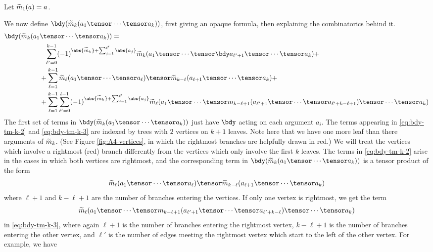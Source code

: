 Let $\widetilde{m}_1(a) = a$.

We now define $\bdy(\tm_k(a_1 \tensor \cdots \tensor a_k))$, first giving an opaque formula, then explaining the combinatorics behind it.
\begin{align}
\notag \bdy(\tm_k(a_1 & \tensor \cdots \tensor a_k)) = \\
\label{eq:bdy-tm-k-1}   & \phantom{+} \sum_{\ell'=0}^{k-1} (-1)^{\abs{\tm_k}+\sum_{j=1}^{\ell'} \abs{a_j}} \tm_k(a_1 \tensor \cdots \tensor \bdy a_{\ell'+1} \tensor \cdots \tensor a_k) + \\
\label{eq:bdy-tm-k-2}   &          +  \sum_{\ell=1}^{k-1} \tm_{\ell}(a_1 \tensor \cdots \tensor a_{\ell}) \tensor \tm_{k-\ell}(a_{\ell+1} \tensor \cdots \tensor a_k) + \\
\label{eq:bdy-tm-k-3}   &          +  \sum_{\ell=1}^{k-1} \sum_{\ell'=0}^{l-1} (-1)^{\abs{\tm_k}+\sum_{j=1}^{\ell'} \abs{a_j}} \tm_{\ell}(a_1 \tensor \cdots \tensor m_{k-\ell + 1}(a_{\ell' + 1} \tensor \cdots \tensor a_{\ell' + k - \ell + 1}) \tensor \cdots \tensor a_k)
\end{align}
The first set of terms in $\bdy(\tm_k(a_1 \tensor \cdots \tensor a_k))$ just have $\bdy$ acting on each argument $a_i$.
The terms appearing in \eqref{eq:bdy-tm-k-2} and \eqref{eq:bdy-tm-k-3} are indexed by trees with $2$ vertices on $k+1$ leaves.
Note here that we have one more leaf than there arguments of $\widetilde{m}_k$.
(See Figure \ref{fig:A4-vertices}, in which the rightmost branches are helpfully drawn in red.)
We will treat the vertices which involve a rightmost (red) branch differently from the vertices which only involve the first $k$ leaves.
The terms in \eqref{eq:bdy-tm-k-2} arise in the cases in which both
vertices are rightmost, and the corresponding term in $\bdy(\tm_k(a_1 \tensor \cdots \tensor a_k))$ is a tensor product of the form
$$\tm_{\ell}(a_1 \tensor \cdots \tensor a_{\ell}) \tensor \tm_{k-\ell}(a_{\ell+1} \tensor \cdots \tensor a_k)$$
where $\ell + 1$ and $k - \ell + 1$ are the number of branches entering the vertices.
If only one vertex is rightmost, we get the term $$\tm_{\ell}(a_1 \tensor \cdots \tensor m_{k-\ell+1}(a_{\ell' + 1} \tensor \cdots \tensor a_{\ell' + k - \ell}) \tensor \cdots \tensor a_k)$$
in \eqref{eq:bdy-tm-k-3},
where again $\ell + 1$ is the number of branches entering the rightmost vertex, $k-\ell+1$ is the number of branches entering the other vertex, and $\ell'$ is the number of edges meeting the rightmost vertex which start to the left of the other vertex.
For example, we have
